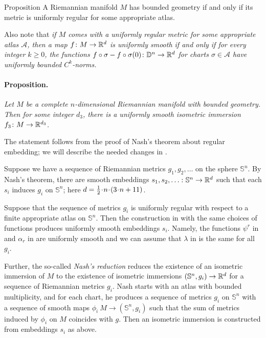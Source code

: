 \arxiv{\documentclass[a4paper,10pt]{article}}{\documentclass{mjm}}
\begin{document}
\begin{thm}{Proposition}
A Riemannian manifold $M$ has bounded geometry if and only if its metric is uniformly regular for some appropriate atlas.
\end{thm}

Also note that \textit{if $M$ comes with a uniformly regular metric for some appropriate atlas $\mathcal{A}$,
then a map $f\colon M\to \mathbb{R}^d$ is uniformly smooth if and only if for every integer $k\ge 0$,
the functions $f\circ\sigma-f\circ\sigma(0)\colon \mathbb{D}^n\to \mathbb{R}^d$ for charts $\sigma\in \mathcal{A}$
have uniformly bounded $C^k$-norms.}


\paragraph{Proposition.}\label{par:nash}
\textit{Let $M$ be a complete $n$-dimensional Riemannian manifold with bounded geometry.
Then for some integer $d_3$, there is a uniformly smooth isometric immersion $f_3\colon M\to\mathbb{R}^{d_3}$.}

\medskip

The statement follows from the proof of Nash's theorem about regular embedding;
we will describe the needed changes in \cite{nash}.

Suppose we have a sequence of Riemannian metrics $g_1,g_2,\dots $ on the sphere $\mathbb{S}^n$.
By Nash's theorem, there are smooth embeddings $s_1,s_2,\z\dots\:\mathbb{S}^n\to \RR^d$
such that each $s_i$ induces $g_i$ on $\mathbb{S}^n$; here $d\z=\tfrac12\cdot n\cdot(3\cdot n+11)$.

Suppose that the sequence of metrics $g_i$ is uniformly regular with respect to a finite appropriate atlas on $\mathbb{S}^n$.
Then the construction in \cite[Part C]{nash} with the same choices of functions produces uniformly smooth embeddings $s_i$.
Namely, the functions $\psi^r$ in \cite[(C2)]{nash} and $\alpha_r$ in \cite[(C10)]{nash} are uniformly smooth and we can assume that $\lambda$ in \cite[(C12)]{nash} is the same for all $g_i$. 

Further, the so-called \emph{Nash's reduction} \cite[Part D]{nash} reduces the existence of an isometric immersion of $M$ to the existence of isometric immersions $(\mathbb{S}^n,g_i)\to \mathbb{R}^d$ for a sequence of Riemannian metrics $g_i$.
Nash starts with an atlas with bounded multiplicity, and for each chart, he produces a sequence of metrics $g_i$ on $\mathbb{S}^n$ with a sequence of smooth maps $\phi_i\:M\to (\mathbb{S}^n,g_i)$ 
such that the sum of metrics induced by $\phi_i$ on $M$ coincides with $g$.
Then an isometric immersion is constructed from embeddings $s_i$ as above.
\end{document}
